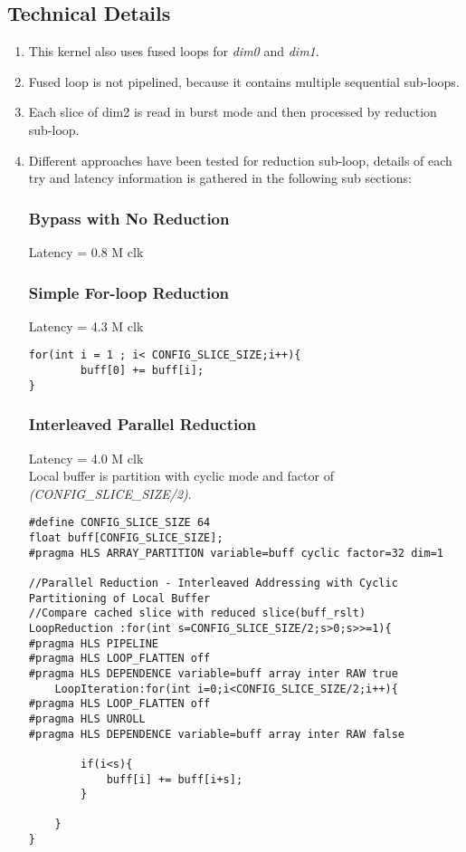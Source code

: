 \documentclass[•]{article}
\begin{document}
\subsection{Technical Details}
\begin{enumerate}
\item This kernel also uses fused loops for \emph{dim0} and \emph{dim1}.

\item Fused loop is not pipelined, because it contains multiple sequential sub-loops.

\item Each slice of dim2 is read in burst mode and then processed by reduction sub-loop.

\item Different approaches have been tested for reduction sub-loop, details of each try and latency information is gathered in the following sub sections:

\subsubsection{Bypass with No Reduction}
Latency = 0.8 M clk

\subsubsection{Simple For-loop Reduction}
Latency = 4.3 M clk
\begin{lstlisting}
for(int i = 1 ; i< CONFIG_SLICE_SIZE;i++){
    	buff[0] += buff[i];
}
\end{lstlisting}

\subsubsection{Interleaved Parallel Reduction}
Latency = 4.0 M clk \\
Local buffer is partition with cyclic mode and factor of \emph{(CONFIG\_SLICE\_SIZE/2)}.

\begin{lstlisting}
#define CONFIG_SLICE_SIZE 64
float buff[CONFIG_SLICE_SIZE];
#pragma HLS ARRAY_PARTITION variable=buff cyclic factor=32 dim=1

//Parallel Reduction - Interleaved Addressing with Cyclic Partitioning of Local Buffer
//Compare cached slice with reduced slice(buff_rslt)
LoopReduction :for(int s=CONFIG_SLICE_SIZE/2;s>0;s>>=1){
#pragma HLS PIPELINE
#pragma HLS LOOP_FLATTEN off
#pragma HLS DEPENDENCE variable=buff array inter RAW true
	LoopIteration:for(int i=0;i<CONFIG_SLICE_SIZE/2;i++){
#pragma HLS LOOP_FLATTEN off
#pragma HLS UNROLL
#pragma HLS DEPENDENCE variable=buff array inter RAW false

		if(i<s){
			buff[i] += buff[i+s];
		}

	}
}
\end{lstlisting}

\end{enumerate}
\end{document}
